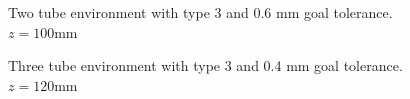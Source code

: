\begin{figure}
    \caption{Two tube environment with type 3 and 0.6 mm goal tolerance. $z=100$mm}
    \label{fig:two-tube-traj}
\end{figure}
\begin{figure}
    \caption{Three tube environment with type 3 and 0.4 mm goal tolerance. $z=120$mm}
    \label{fig:three-tube-traj}
\end{figure}
